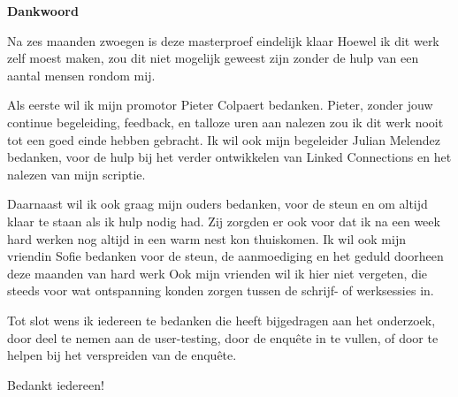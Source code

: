 \thispagestyle{empty}    %
\begin{center}
\textbf{Dankwoord}
\end{center}

Na zes maanden zwoegen is deze masterproef eindelijk klaar Hoewel ik dit werk zelf moest maken, zou dit niet mogelijk geweest zijn zonder de hulp van een aantal mensen rondom mij.

Als eerste wil ik mijn promotor Pieter Colpaert bedanken. Pieter, zonder jouw continue begeleiding, feedback, en talloze uren aan nalezen zou ik dit werk nooit tot een goed einde hebben gebracht. Ik wil ook mijn begeleider Julian Melendez bedanken, voor de hulp bij het verder ontwikkelen van Linked Connections en het nalezen van mijn scriptie.

Daarnaast wil ik ook graag mijn ouders bedanken, voor de steun en om altijd klaar te staan als ik hulp nodig had. Zij zorgden er ook voor dat ik na een week hard werken nog altijd in een warm nest kon thuiskomen. Ik wil ook mijn vriendin Sofie bedanken voor de steun, de aanmoediging en het geduld doorheen deze maanden van hard werk Ook mijn vrienden wil ik hier niet vergeten, die steeds voor wat ontspanning konden zorgen tussen de schrijf- of werksessies in.

Tot slot wens ik iedereen te bedanken die heeft bijgedragen aan het onderzoek, door deel te nemen aan de user-testing, door de enquête in te vullen, of door te helpen bij het verspreiden van de enquête.

Bedankt iedereen! 